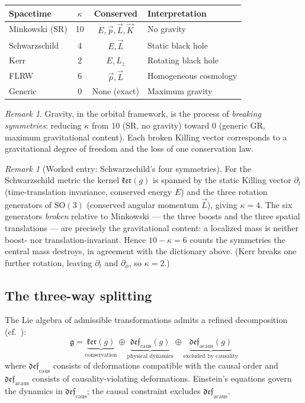 \documentclass[12pt]{article}
\theoremstyle{plain}
\theoremstyle{definition}
\theoremstyle{remark}
\newtheorem{remark}[theorem]{Remark}
\newcommand{\SO}{\mathrm{SO}}
\begin{document}
\begin{center}\small
\begin{tabular}{lccl}\toprule
\textbf{Spacetime} & $\kappa$ & \textbf{Conserved} & \textbf{Interpretation}\\\midrule
Minkowski (SR) & 10 & $E, \vec{p}, \vec{L}, \vec{K}$ & No gravity \\
Schwarzschild & 4 & $E, \vec{L}$ & Static black hole \\
Kerr & 2 & $E, L_z$ & Rotating black hole \\
FLRW & 6 & $\vec{p}, \vec{L}$ & Homogeneous cosmology \\
Generic & 0 & None (exact) & Maximum gravity \\
\bottomrule
\end{tabular}
\end{center}

\begin{remark}
Gravity, in the orbital framework, is the process of \emph{breaking symmetries}: reducing $\kappa$ from 10 (SR, no gravity) toward 0 (generic GR, maximum gravitational content). Each broken Killing vector corresponds to a gravitational degree of freedom and the loss of one conservation law.
\end{remark}

\begin{remark}[Worked entry: Schwarzschild's four symmetries]\label{rmk:schw-kappa}
For the Schwarzschild metric the kernel $\mathfrak{ker}(g)$ is spanned by the static Killing vector $\partial_t$
(time-translation invariance, conserved energy $E$) and the three rotation generators of $\SO(3)$ (conserved
angular momentum $\vec L$), giving $\kappa=4$. The six generators \emph{broken} relative to Minkowski --- the
three boosts and the three spatial translations --- are precisely the gravitational content: a localized mass is
neither boost- nor translation-invariant. Hence $10-\kappa=6$ counts the symmetries the central mass destroys,
in agreement with the dictionary above. (Kerr breaks one further rotation, leaving $\partial_t$ and $\partial_\phi$,
so $\kappa=2$.)
\end{remark}

\subsection{The three-way splitting}

The Lie algebra of admissible transformations admits a refined decomposition (cf.~\cite{nembe2026vol17}):
\begin{equation}
\mathfrak{g} = \underbrace{\mathfrak{ker}(g)}_{\text{conservation}} \oplus \underbrace{\mathfrak{def}_{\mathrm{caus}}(g)}_{\text{physical dynamics}} \oplus \underbrace{\mathfrak{def}_{\mathrm{acaus}}(g)}_{\text{excluded by causality}}
\end{equation}
where $\mathfrak{def}_{\mathrm{caus}}$ consists of deformations compatible with the causal order and $\mathfrak{def}_{\mathrm{acaus}}$ consists of causality-violating deformations. Einstein's equations govern the dynamics in $\mathfrak{def}_{\mathrm{caus}}$; the causal constraint excludes $\mathfrak{def}_{\mathrm{acaus}}$.
\end{document}
